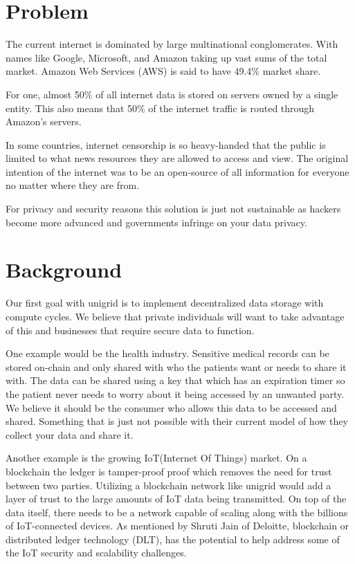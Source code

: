 \documentclass[12pt]{article}
\begin{document}
\newpage
\section*{Problem}

The current internet is dominated by large multinational conglomerates. With names like Google, Microsoft, and Amazon taking up vast sums of the total market. Amazon Web Services (AWS) is said to have 49.4\% market share\cite{jeb2019}.

For one, almost 50\% of all internet data is stored on servers owned by a single entity\cite{jeb2019}. This also means that 50\% of the internet traffic is routed through Amazon’s servers\cite{jeb2019}.

In some countries, internet censorship is so heavy-handed that the public is limited to what news resources they are allowed to access and view\cite{wiki2021}. The original intention of the internet was to be an open-source of all information for everyone no matter where they are from.

For privacy and security reasons this solution is just not sustainable as hackers become more advanced and governments infringe on your data privacy.


\section*{Background}
Our first goal with unigrid is to implement decentralized data storage with compute cycles. We believe that private individuals will want to take advantage of this and businesses that require secure data to function.

One example would be the health industry. Sensitive medical records can be stored on-chain and only shared with who the patients want or needs to share it with. The data can be shared using a key that which has an expiration timer so the patient never needs to worry about it being accessed by an unwanted party. We believe it should be the consumer who allows this data to be accessed and shared. Something that is just not possible with their current model of how they collect your data and share it.

Another example is the growing IoT(Internet Of Things) market. On a blockchain the ledger is tamper-proof proof which removes the need for trust between two parties. Utilizing a blockchain network like unigrid would add a layer of trust to the large amounts of IoT data being transmitted. On top of the data itself, there needs to be a network capable of scaling along with the billions of IoT-connected devices. As mentioned by Shruti Jain of Deloitte\cite{jain2021}, blockchain or distributed ledger technology (DLT), has the potential to help address some of the IoT security and scalability challenges.
\end{document}
